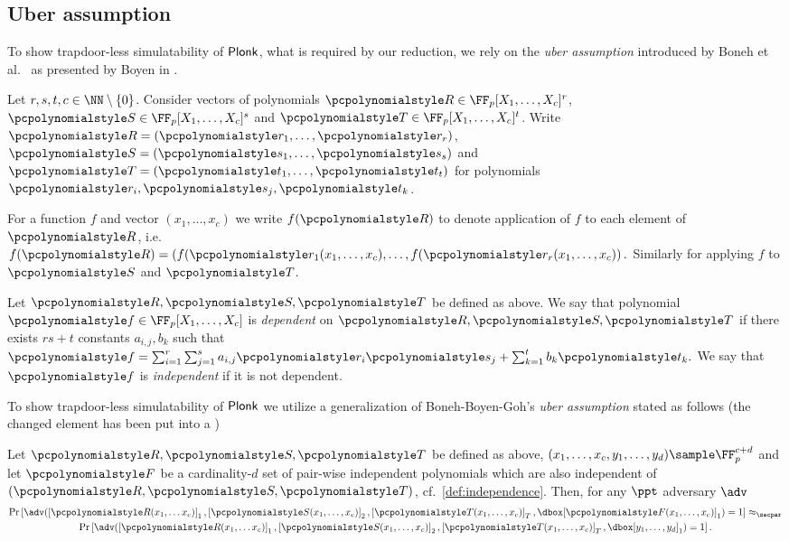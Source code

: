 \subsection{Uber assumption}
\label{sec:uber_assumption}
  To show trapdoor-less simulatability of $\textnormal{\textsf{Plonk}}$, what
is required by our reduction, we rely on the \emph{uber assumption} introduced by
Boneh et al.~\cite{EC:BonBoyGoh05} as presented by Boyen in \cite{PAIRING:Boyen08}.

Let $r, s, t, c \in \NN \setminus \smallset{0}$. Consider vectors of polynomials
$\pR \in \FF_p[X_1, \ldots, X_c]^r$, $\pS \in \FF_p[X_1, \ldots, X_c]^s$ and
$\pT \in \FF_p[X_1, \ldots, X_c]^t$. Write $\pR = \left( \p{r}_1, \ldots,
  \p{r}_r \right)$, $\pS = \left( \p{s}_1, \ldots, \p{s}_s \right)$ and $\pT =
\left( \p{t}_1, \ldots, \p{t}_t \right)$ for polynomials $\p{r}_i, \p{s}_j,
\p{t}_k$.

For a function $f$ and vector $(x_1, \ldots, x_c)$ we write $f(\pR)$ to
denote application of $f$ to each element of $\pR$, i.e.
\(
	f(\pR) = \left( f(\p{r}_1 (x_1, \ldots, x_c), \ldots, f(\p{r}_r
	(x_1, \ldots, x_c) \right).
\)
Similarly for applying $f$ to $\pS$ and $\pT$.

\begin{definition}[Independence of $\pR, \pS, \pT$]
	\label{def:independence}
	Let $\pR, \pS, \pT$ be defined as above. We say that polynomial $\p{f} \in
  \FF_p[X_1, \ldots, X_c]$ is \emph{dependent} on $\pR, \pS, \pT$ if there
  exists $rs + t$ constants $a_{i, j}, b_k$ such that $ \p{f} = \sum_{i = 1}^{r}
  \sum_{j = 1}^{s} a_{i, j} \p{r}_i \p{s}_j + \sum_{k = 1}^{t} b_k \p{t}_k. $ We
  say that $\p{f}$ is \emph{independent} if it is not dependent.
\end{definition}

To show trapdoor-less simulatability of $\textnormal{\textsf{Plonk}}$ we utilize a generalization of
Boneh-Boyen-Goh's \emph{uber assumption} \cite{EC:BonBoyGoh05} stated as follows (the
changed element has been put into a )
\begin{definition}
	\label{def:uber_assumption}
	Let $\pR, \pS, \pT$ be defined as above,
    $(x_1, \ldots, x_c, y_1, \ldots, y_{d}) \sample \FF_p^{c + d}$ and let
    $\p{F}$ be a cardinality-$d$ set of pair-wise independent polynomials which are also
    independent of $(\pR, \pS, \pT)$, cf.~\cref{def:independence}.  Then, for
    any $\ppt$ adversary $\adv$
	\begin{multline*}
      \Pr\left[\adv(\gone{\pR(x_1, \ldots x_c)}, \gtwo{\pS(x_1, \ldots, x_c)},
		\gtar{\pT(x_1, \ldots, x_c)}, \dboxed{\gone{\p{F}(x_1, \ldots, x_c)}}) = 1\right] \approx_\secpar \\
      \Pr\left[\adv(\gone{\pR(x_1, \ldots x_c)}, \gtwo{\pS(x_1, \ldots, x_c)},
        \gtar{\pT(x_1, \ldots, x_c)}, \dboxed{\gone{y_1, \ldots, y_{d}}}) =
        1\right].
	\end{multline*}
\end{definition}

